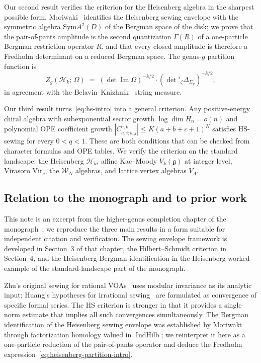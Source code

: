 \documentclass[11pt,reqno]{amsart}
\theoremstyle{definition}
\theoremstyle{remark}
\newcommand{\cH}{\mathcal{H}}
\newcommand{\cW}{\mathcal{W}}
\newcommand{\Sym}{\mathrm{Sym}}
\newcommand{\Vir}{\mathrm{Vir}}
\newcommand{\fg}{\mathfrak{g}}
\numberwithin{equation}{section}
\begin{document}
Our second result verifies the criterion for the Heisenberg
algebra in the sharpest possible form. Moriwaki~\cite{Moriwaki26b}
identifies the Heisenberg sewing envelope with the symmetric
algebra $\Sym A^2(D)$ of the Bergman space of the disk; we prove
that the pair-of-pants amplitude is the second quantization
$\Gamma(R)$ of a one-particle Bergman restriction operator $R$,
and that every closed amplitude is therefore a Fredholm
determinant on a reduced Bergman space. The genus-$g$ partition
function is
\begin{equation}\label{eq:heisenberg-partition-intro}
Z_g(\cH_k;\,\Omega)
\;=\;
(\det\operatorname{Im}\Omega)^{-k/2}
\cdot (\det{}'_\zeta \Delta_{\Sigma_g})^{-k/2},
\end{equation}
in agreement with the Belavin--Knizhnik~\cite{BK86} string measure.

Our third result turns~\eqref{eq:hs-intro} into a general
criterion. Any positive-energy chiral algebra with subexponential
sector growth $\log\dim H_n = o(n)$ and polynomial OPE coefficient
growth $|C^{c,k}_{a,i;b,j}| \leq K(a+b+c+1)^N$ satisfies HS-sewing
for every $0 < q < 1$. These are both conditions that can be
checked from character formulas and OPE tables. We verify the
criterion on the standard landscape: the Heisenberg $\cH_k$,
affine Kac--Moody $V_k(\fg)$ at integer level, Virasoro
$\Vir_c$, the $\cW_N$ algebras, and lattice vertex algebras
$V_\Lambda$.

\subsection{Relation to the monograph and to prior work}

This note is an excerpt from the higher-genus completion chapter of
the monograph~\cite{LorgatVolI}; we reproduce the three main
results in a form suitable for independent citation and
verification. The sewing envelope framework is developed in
Section~3 of that chapter, the Hilbert--Schmidt criterion in
Section~4, and the Heisenberg Bergman identification in the
Heisenberg worked example of the standard-landscape part of the
monograph.

Zhu's original sewing for rational VOAs~\cite{Zhu96} uses modular
invariance as its analytic input; Huang's hypotheses for
irrational sewing~\cite{Huang05} are formulated as convergence
of specific formal series. The HS criterion is stronger in that
it provides a single norm estimate that implies all such
convergences simultaneously. The Bergman identification of the
Heisenberg sewing envelope was established by
Moriwaki~\cite{Moriwaki26b} through factorization homology valued
in $\operatorname{IndHilb}$; we reinterpret it here as a
one-particle reduction of the pair-of-pants operator and deduce
the Fredholm expression~\eqref{eq:heisenberg-partition-intro}.
\end{document}
